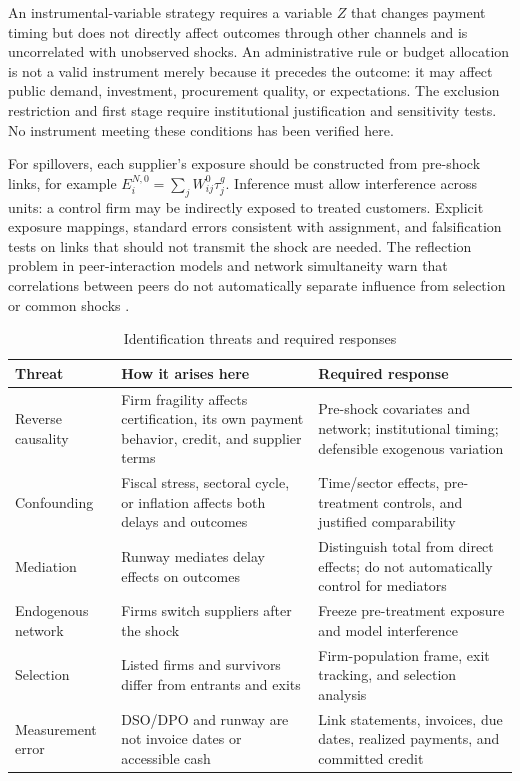 \documentclass[11pt,a4paper]{article}
\begin{document}
An instrumental-variable strategy requires a variable $Z$ that changes payment timing but does not directly affect outcomes through other channels and is uncorrelated with unobserved shocks. An administrative rule or budget allocation is not a valid instrument merely because it precedes the outcome: it may affect public demand, investment, procurement quality, or expectations. The exclusion restriction and first stage require institutional justification and sensitivity tests. No instrument meeting these conditions has been verified here.

For spillovers, each supplier’s exposure should be constructed from pre-shock links, for example $E_i^{N,0}=\sum_j W^0_{ij}\tau^g_j$. Inference must allow interference across units: a control firm may be indirectly exposed to treated customers. Explicit exposure mappings, standard errors consistent with assignment, and falsification tests on links that should not transmit the shock are needed. The reflection problem in peer-interaction models and network simultaneity warn that correlations between peers do not automatically separate influence from selection or common shocks \citep{manski1993,bramoulle2009}.

\begin{table}[htbp]\centering\small
\caption{Identification threats and required responses}
\begin{tabularx}{\linewidth}{p{.23\linewidth}X X}\toprule
Threat & How it arises here & Required response \\
\midrule
Reverse causality & Firm fragility affects certification, its own payment behavior, credit, and supplier terms & Pre-shock covariates and network; institutional timing; defensible exogenous variation \\
Confounding & Fiscal stress, sectoral cycle, or inflation affects both delays and outcomes & Time/sector effects, pre-treatment controls, and justified comparability \\
Mediation & Runway mediates delay effects on outcomes & Distinguish total from direct effects; do not automatically control for mediators \\
Endogenous network & Firms switch suppliers after the shock & Freeze pre-treatment exposure and model interference \\
Selection & Listed firms and survivors differ from entrants and exits & Firm-population frame, exit tracking, and selection analysis \\
Measurement error & DSO/DPO and runway are not invoice dates or accessible cash & Link statements, invoices, due dates, realized payments, and committed credit \\
\bottomrule\end{tabularx}\end{table}
\end{document}
